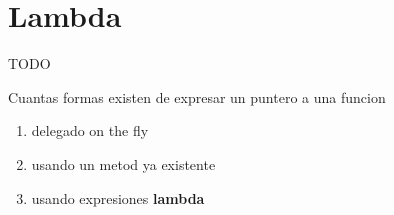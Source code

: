 \section{Lambda}

TODO

Cuantas formas existen de expresar un puntero a una funcion
\begin{enumerate}
\item delegado on the fly
\item usando un metod ya existente
\item usando expresiones \textbf{lambda}
\end{enumerate}
